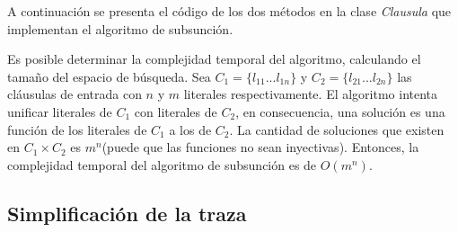 \documentclass[a4paper,12pt]{article}
\begin{document}
A continuación se presenta el código de los dos métodos en la clase \emph{Clausula} que implementan
el algoritmo de subsunción.


Es posible determinar la complejidad temporal del algoritmo, calculando el tamaño del espacio de búsqueda.
Sea $C_1 = \{l_{11}...l_{1n}\}$ y $C_2 = \{l_{21}...l_{2n}\}$ las cláusulas de entrada con $n$ y $m$ literales respectivamente. 
El algoritmo intenta unificar literales de $C_1$ con literales de $C_2$, en consecuencia, una solución es una función
de los literales de $C_1$ a los de $C_2$. La cantidad de soluciones que existen en $C_1 \times C_2$ es $m^n$(puede que las funciones no sean inyectivas).
Entonces, la complejidad temporal del algoritmo de subsunción es de $O(m^n)$.
\subsection{Simplificación de la traza}


\end{document}
